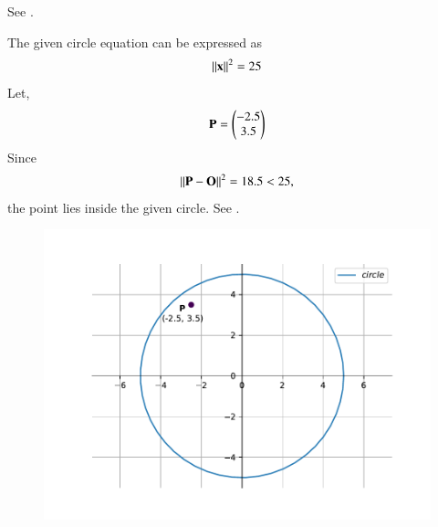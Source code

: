 See 
.
\begin{table}[H]
\begin{center}

\end{center}
\caption{}
\label{tab:chapters/11/11/1/15/}
\end{table}
The given circle equation can be expressed as
\begin{align}
	\left\lVert\mathbf{x}\right\rVert^2= 25
\end{align}
Let,
\begin{align}
	\mathbf{P}=\begin{pmatrix}-2.5\\3.5\end{pmatrix}
\end{align}
Since
\begin{align}
	\left\lVert\mathbf{P} - \mathbf{O}\right\rVert^2 =
 18.5 < 25,
\end{align}
the point lies inside the given circle.
See 
    .
\begin{figure}[H]
  \centering
    \includegraphics[width=0.75\columnwidth]{chapters/11/11/1/15/figs/fig.pdf}
    \caption{}
    \label{fig:chapters/11/11/1/15/}
\end{figure}
